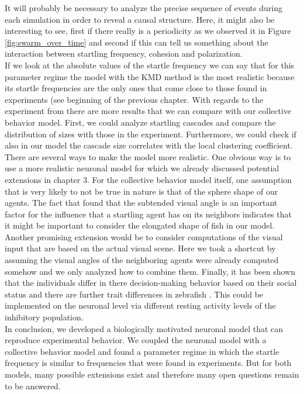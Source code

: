     It will probably be necessary to analyze the precise sequence of events during each simulation in order to reveal a causal structure.
    Here, it might also be interesting to see, first if there really is a periodicity as we observed it in Figure \ref{fig:swarm_over_time} and second if this can tell us something about the interaction between startling frequency, cohesion and polarization.\\
    If we look at the absolute values of the startle frequency we can say that for this parameter regime the model with the KMD method is the most realistic because its startle frequencies are the only ones that come close to those found in experiments (see beginning of the previous chapter.
    With regards to the experiment from \cite{Rosenthal2015} there are more results that we can compare with our collective behavior model.
    First, we could analyze startling cascades and compare the distribution of sizes with those in the experiment.
    Furthermore, we could check if also in our model the cascade size correlates with the local clustering coefficient.\\
    There are several ways to make the model more realistic.
    One obvious way is to use a more realistic neuronal model for which we already discussed potential extensions in chapter 3.
    For the collective behavior model itself, one assumption that is very likely to not be true in nature is that of the sphere shape of our agents.
    The fact that \cite{Rosenthal2015} found that the subtended visual angle is an important factor for the influence that a startling agent has on its neighbors indicates that it might be important to consider the elongated shape of fish in our model.
    Another promising extension would be to consider computations of the visual input that are based on the actual visual scene.
    Here we took a shortcut by assuming the visual angles of the neighboring agents were already computed somehow and we only analyzed how to combine them.
    Finally, it has been shown that the individuals differ in there decision-making behavior based on their social status \citep{Miller2017} and there are further trait differences in zebrafish \citep{Khan2017}.
    This could be implemented on the neuronal level via different resting activity levels of the inhibitory population.\\
    In conclusion, we developed a biologically motivated neuronal model that can reproduce experimental behavior.
    We coupled the neuronal model with a collective behavior model and found a parameter regime in which the startle frequency is similar to frequencies that were found in experiments.
    But for both models, many possible extensions exist and therefore many open questions remain to be answered.

